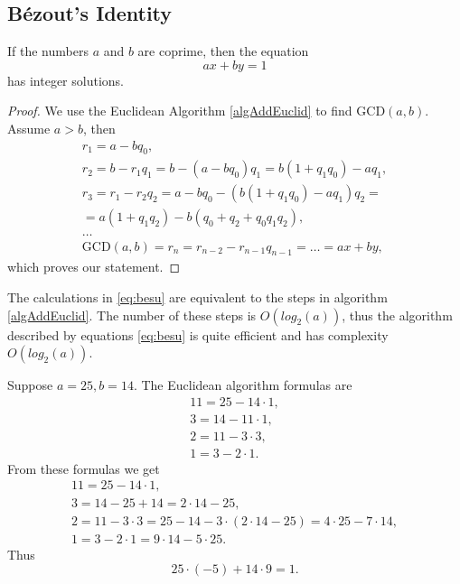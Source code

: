 \subsection{Bézout's Identity}

\begin{theorem}[Bézout]
\label{thm:besu}
If the numbers $a$ and $b$ are coprime, then the equation 
\[
ax + by = 1
\] 
has integer solutions.
\begin{proof}
We use the Euclidean Algorithm \ref{algAddEuclid} to find $\mbox{GCD}\left(a, b\right)$.
Assume $a > b$, then
\begin{eqnarray}
r_1 = a - b q_0, 
\nonumber \\
r_2 = b - r_1 q_1 = b - (a - b q_0)q_1 = b(1+q_1 q_0) - a q_1, 
\nonumber \\
r_3 = r_1 - r_2 q_2 = a - b q_0 - \left(b(1+q_1 q_0) - a q_1\right)q_2
= \nonumber \\
= a(1+q_1 q_2) - b(q_0 + q_2 + q_0 q_1 q_2),
\nonumber \\
\dots
\nonumber \\
\mbox{GCD}\left(a, b\right) = r_n = r_{n-2} - r_{n-1} q_{n-1} = \dots
= a x + b y, 
\label{eq:besu}
\end{eqnarray}
which proves our statement.
\end{proof}
\end{theorem}

\begin{remark}
\label{rem:besu}
The calculations in \eqref{eq:besu} are equivalent to the steps in algorithm \ref{algAddEuclid}. The number of these steps is $O\left(log_2(a)\right)$, thus the algorithm described by equations \eqref{eq:besu} is quite efficient and has complexity $O\left(log_2(a)\right)$.
\end{remark}

\begin{example}
\label{ex:besu}
Suppose $a = 25, b = 14$. The Euclidean algorithm formulas are
\begin{eqnarray}
11 = 25 - 14 \cdot 1,
\nonumber \\
3 = 14 - 11 \cdot 1,
\nonumber \\
2 = 11 - 3 \cdot 3,
\nonumber \\
1 = 3 - 2 \cdot 1.
\nonumber
\end{eqnarray}
From these formulas we get
\begin{eqnarray}
11 = 25 - 14 \cdot 1,
\nonumber \\
3 = 14 - 25 + 14 = 2 \cdot 14 - 25,
\nonumber \\
2 = 11 - 3 \cdot 3 = 25 - 14 - 3 \cdot (2 \cdot 14 - 25) = 4 \cdot 25 - 7 \cdot 14,
\nonumber \\
1 = 3 - 2 \cdot 1 = 9 \cdot 14 - 5 \cdot 25.
\nonumber
\end{eqnarray}
Thus 
\[
25 \cdot (-5)  + 14 \cdot 9 = 1.
\]
\end{example}